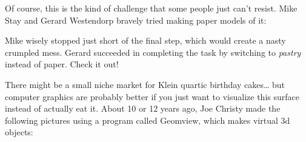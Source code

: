 \documentclass{article}
\def\tightlist{}
\renewcommand{\texttt}[1]{%
  \begingroup
  \ttfamily
  \begingroup\lccode`~=`/\lowercase{\endgroup\def~}{/\discretionary{}{}{}}%
  \begingroup\lccode`~=`[\lowercase{\endgroup\def~}{[\discretionary{}{}{}}%
  \begingroup\lccode`~=`.\lowercase{\endgroup\def~}{.\discretionary{}{}{}}%
  \catcode`/=\active\catcode`[=\active\catcode`.=\active
  \scantokens{#1\noexpand}%
  \endgroup
}
\begin{document}
Of course, this is the kind of challenge that some people just can't
resist. Mike Stay and Gerard Westendorp bravely tried making paper
models of it:


Mike wisely stopped just short of the final step, which would create a
nasty crumpled mess. Gerard succeeded in completing the task by
switching to \emph{pastry} instead of paper. Check it out!

There might be a small niche market for Klein quartic birthday
cakes\ldots{} but computer graphics are probably better if you just want
to visualize this surface instead of actually eat it. About 10 or 12
years ago, Joe Christy made the following pictures using a program
called Geomview, which makes virtual 3d objects:

\end{document}
